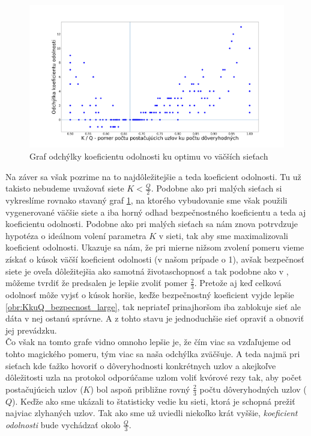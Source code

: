 \begin{figure}
\centerline{\includegraphics[width=1.2\textwidth]{images/KkuQ_odchylka_large.png}}
\caption{Graf odchýlky koeficientu odolnosti ku optimu vo väčších sieťach} \label{obr:KkuQ_odchylka_large}
\end{figure}

Na záver sa však pozrime na to najdôležitejšie a teda koeficient odolnosti.
Tu už takisto nebudeme uvažovať siete $K<\frac{Q}{2}$.
Podobne ako pri malých sieťach si vykreslíme rovnako stavaný graf
\ref{obr:KkuQ_odchylka_large}, na ktorého vybudovanie sme však použili vygenerované
väčšie siete a iba horný odhad bezpečnostného koeficientu a teda aj koeficientu
odolnosti.
Podobne ako pri malých sieťach sa nám znova potrvdzuje hypotéza o ideálnom
volení parametra $K$ v sieti, tak aby sme maximalizovali koeficient odolnosti.
Ukazuje sa nám, že pri mierne nižsom zvolení pomeru vieme získať o kúsok
väčší koeficient odolnosti (v našom prípade o 1), avšak bezpečnosť siete je oveľa
dôležitejšia ako samotná životaschopnosť a tak podobne ako v \cite{li2007beyond},
môžeme tvrdiť že predsalen je lepšie zvoliť pomer $\frac{2}{3}$. Pretože aj keď
celková odolnosť môže vyjsť o kúsok horšie, keďže bezpečnostný koeficient vyjde
lepšie \ref{obr:KkuQ_bezpecnost_large}, tak nepriateľ prinajhoršom iba zablokuje
sieť ale dáta v nej ostanú správne. A z tohto stavu je jednoduchšie sieť opraviť
a obnoviť jej prevádzku.\\
Čo však na tomto grafe vidno omnoho lepšie je, že čím viac sa vzďaľujeme od tohto
magického pomeru, tým viac sa naša odchýlka zväčšuje.
A teda najmä pri sieťach kde ťažko hovoriť o dôveryhodnosti konkrétnych uzlov
a akejkoľve dôležitosti uzla na protokol odporúčame uzlom voliť kvórové rezy
tak, aby počet postačujúcich uzlov ($K$) bol aspoň približne rovný $\frac{2}{3}$
počtu dôveryhodných uzlov ($Q$). Keďže ako sme ukázali to štatisticky vedie
ku sieti, ktorá je schopná prežiť najviac zlyhaných uzlov. Tak ako sme už uviedli
niekoľko krát vyššie, \textit{koeficient odolnosti} bude vychádzať okolo $\frac{Q}{3}$.